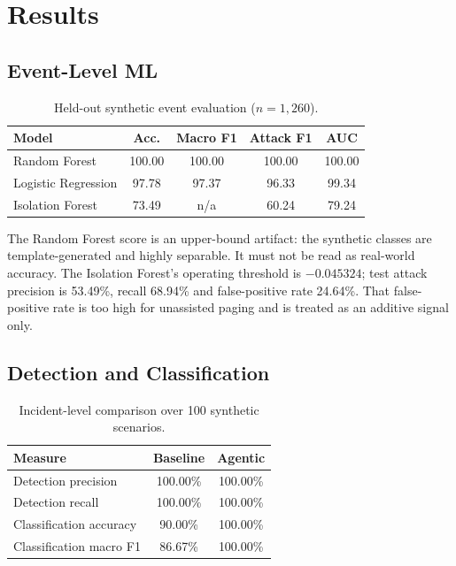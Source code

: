 \documentclass[10pt,twocolumn]{article}
\begin{document}
\section{Results}

\subsection{Event-Level ML}

\begin{table}[h]
\centering
\small
\caption{Held-out synthetic event evaluation ($n=1{,}260$).}
\label{tab:ml}
\begin{tabular}{lcccc}
\toprule
Model & Acc. & Macro F1 & Attack F1 & AUC \\
\midrule
Random Forest & 100.00 & 100.00 & 100.00 & 100.00 \\
Logistic Regression & 97.78 & 97.37 & 96.33 & 99.34 \\
Isolation Forest & 73.49 & n/a & 60.24 & 79.24 \\
\bottomrule
\end{tabular}
\end{table}

The Random Forest score is an upper-bound artifact: the synthetic classes are template-generated and highly separable. It must not be read as real-world accuracy. The Isolation Forest's operating threshold is $-0.045324$; test attack precision is 53.49\%, recall 68.94\% and false-positive rate 24.64\%. That false-positive rate is too high for unassisted paging and is treated as an additive signal only.

\subsection{Detection and Classification}

\begin{table}[h]
\centering
\small
\caption{Incident-level comparison over 100 synthetic scenarios.}
\label{tab:scenario}
\begin{tabular}{lcc}
\toprule
Measure & Baseline & Agentic \\
\midrule
Detection precision & 100.00\% & 100.00\% \\
Detection recall & 100.00\% & 100.00\% \\
Classification accuracy & 90.00\% & 100.00\% \\
Classification macro F1 & 86.67\% & 100.00\% \\
\bottomrule
\end{tabular}
\end{table}
\end{document}
